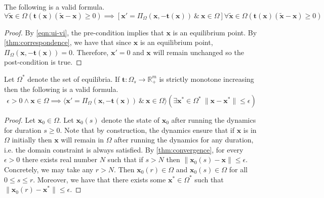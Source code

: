 \begin{theorem}
    The following is a valid formula.
    $$\forall \mathbf{\tilde{x}} \in \Omega (\mathbf{t}(\mathbf{x})(\mathbf{\tilde{x}}- \mathbf{x}) \geq 0) \implies [\mathbf{x}'=\Pi_{\Omega}(\mathbf{x}, -\mathbf{t}(\mathbf{x}))\ \&\ \mathbf{x}\in \Omega] \forall \mathbf{\tilde{x}} \in \Omega (\mathbf{t}(\mathbf{x})(\mathbf{\tilde{x}}- \mathbf{x}) \geq 0)$$
\end{theorem}

\begin{proof}
    By \eqref{eqn:ui-vi}, the pre-condition implies that $\mathbf{x}$ is an equilibrium point.
    By \cref{thm:correspondence}, we have that since $\mathbf{x}$ is an equilibrium point,  $\Pi_{\Omega}(\mathbf{x}, -\mathbf{t}(\mathbf{x})) = 0$.
    Therefore, $\mathbf{x}'=0$ and $\mathbf{x}$ will remain unchanged so the post-condition is true.
\end{proof}

\begin{theorem}
    Let $\Omega^*$ denote the set of equilibria.
    If $\mathbf{t}: \Omega_s \to \mathbb{R}^m_+$ is strictly monotone increasing then the following is a valid formula.
    $$\epsilon > 0\land \mathbf{x} \in \Omega \implies \langle \mathbf{x}'=\Pi_{\Omega}(\mathbf{x}, -\mathbf{t}(\mathbf{x}))\ \&\ \mathbf{x}\in \Omega\rangle (\exists \mathbf{x}^*\in \Omega^*\ \|\mathbf{x} - \mathbf{x}^*\| \leq \epsilon)$$
\end{theorem}

\begin{proof}
    Let $\mathbf{x}_0 \in \Omega$. Let $\mathbf{x}_0(s)$ denote the state of $\mathbf{x}_0$ after running the dynamics for duration $s\geq 0$.
    Note that by construction, the dynamics ensure that if $\mathbf{x}$ is in $\Omega$ initially then $\mathbf{x}$ will remain in $\Omega$ after running the dynamics for any duration, i.e. the domain constraint is always satisfied.
    By \cref{thm:convergence}, for every $\epsilon > 0$ there exists real number $N$ such that if $s > N$ then $\|\mathbf{x}_0(s) - \mathbf{x}\| \leq \epsilon$. 
    Concretely, we may take any $r > N$.
    Then $\mathbf{x}_0(r) \in \Omega$ and $\mathbf{x}_0(s) \in \Omega$ for all $0 \leq s \leq r$.
    Moreover, we have that there exists some $\mathbf{x}^*\in \Omega^*$  such that $\|\mathbf{x}_0(r) - \mathbf{x}^*\| \leq \epsilon$.
\end{proof}
